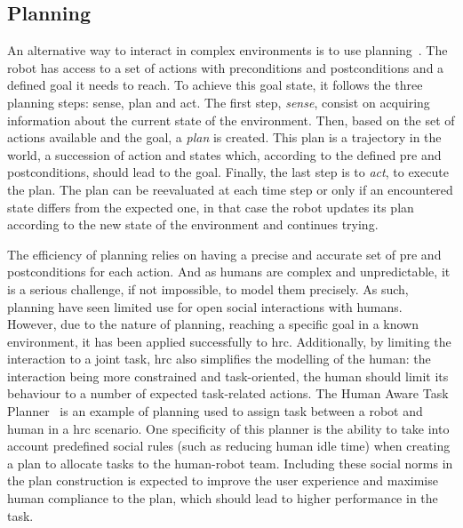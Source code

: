 \subsection{Planning} \label{ssec:planning}
    
    An alternative way to interact in complex environments is to use planning~\citep{asada1986robot}. The robot has access to a set of actions with preconditions and postconditions and a defined goal it needs to reach. To achieve this goal state, it follows the three planning steps: sense, plan and act. The first step, \emph{sense}, consist on acquiring information about the current state of the environment. Then, based on the set of actions available and the goal, a \emph{plan} is created. This plan is a trajectory in the world, a succession of action and states which, according to the defined pre and postconditions, should lead to the goal. Finally, the last step is to \emph{act}, to execute the plan. The plan can be reevaluated at each time step or only if an encountered state differs from the expected one, in that case the robot updates its plan according to the new state of the environment and continues trying.
    
    
    The efficiency of planning relies on having a precise and accurate set of pre and postconditions for each action. And as humans are complex and unpredictable, it is a serious challenge, if not impossible, to model them precisely. As such, planning have seen limited use for open social interactions with humans. However, due to the nature of planning, reaching a specific goal in a known environment, it has been applied successfully to \gls{hrc}. Additionally, by limiting the interaction to a joint task, \gls{hrc} also simplifies the modelling of the human: the interaction being more constrained and task-oriented, the human should limit its behaviour to a number of expected task-related actions. The Human Aware Task Planner~\citep{alili2009task} is an example of planning used to assign task between a robot and human in a \gls{hrc} scenario. One specificity of this planner is the ability to take into account predefined social rules (such as reducing human idle time) when creating a plan to allocate tasks to the human-robot team. Including these social norms in the plan construction is expected to improve the user experience and  maximise human compliance to the plan, which should lead to higher performance in the task.
    
